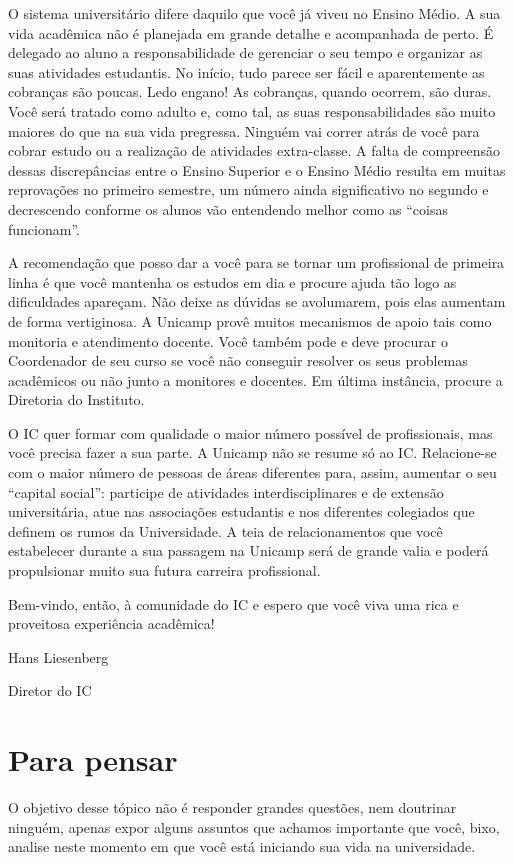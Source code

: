 O sistema universitário difere daquilo que você já viveu no Ensino Médio. A sua
vida acadêmica não é planejada em grande detalhe e acompanhada de perto.
É delegado ao aluno a responsabilidade de gerenciar o seu tempo e organizar as
suas atividades estudantis. No início, tudo parece ser fácil e aparentemente as
cobranças são poucas. Ledo engano! As cobranças, quando ocorrem, são duras. Você
será tratado como adulto e, como tal, as suas responsabilidades são muito
maiores do que na sua vida pregressa. Ninguém vai correr atrás de você para
cobrar estudo ou a realização de atividades extra-classe. A falta de compreensão
dessas discrepâncias entre o Ensino Superior e o Ensino Médio resulta em muitas
reprovações no primeiro semestre, um número ainda significativo no segundo
e decrescendo conforme os alunos vão entendendo melhor como as “coisas
funcionam”.

A recomendação que posso dar a você para se tornar um profissional de primeira
linha é que você mantenha os estudos em dia e procure ajuda tão logo as
dificuldades apareçam. Não deixe as dúvidas se avolumarem, pois elas aumentam de
forma vertiginosa. A Unicamp provê muitos mecanismos de apoio tais como
monitoria e atendimento docente. Você também pode e deve procurar o Coordenador
de seu curso se você não conseguir resolver os seus problemas acadêmicos ou não
junto a monitores e docentes. Em última instância, procure a Diretoria do
Instituto.

O IC quer formar com qualidade o maior número possível de profissionais, mas
você precisa fazer a sua parte.  A Unicamp não se resume só ao IC. Relacione-se
com o maior número de pessoas de áreas diferentes para, assim, aumentar o seu
“capital social”: participe de atividades interdisciplinares e de extensão
universitária, atue nas associações estudantis e nos diferentes colegiados que
definem os rumos da Universidade. A teia de relacionamentos que você estabelecer
durante a sua passagem na Unicamp será de grande valia e poderá propulsionar
muito sua futura carreira profissional.

Bem-vindo, então, à comunidade do IC e espero que você viva uma rica
e proveitosa experiência acadêmica!

Hans Liesenberg

Diretor do IC

\section{Para pensar}
O objetivo desse tópico não é responder grandes questões, nem doutrinar ninguém,
apenas expor alguns assuntos que achamos importante que você, bixo, analise
neste momento em que você está iniciando sua vida na universidade.

